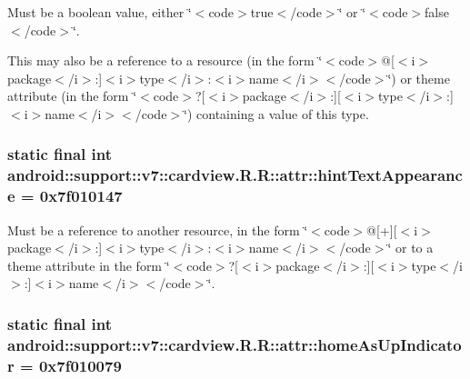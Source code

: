 Must be a boolean value, either \char`\"{}$<$code$>$true$<$/code$>$\char`\"{} or \char`\"{}$<$code$>$false$<$/code$>$\char`\"{}. 

This may also be a reference to a resource (in the form \char`\"{}$<$code$>$@\mbox{[}$<$i$>$package$<$/i$>$:\mbox{]}$<$i$>$type$<$/i$>$:$<$i$>$name$<$/i$>$$<$/code$>$\char`\"{}) or theme attribute (in the form \char`\"{}$<$code$>$?\mbox{[}$<$i$>$package$<$/i$>$:\mbox{]}\mbox{[}$<$i$>$type$<$/i$>$:\mbox{]}$<$i$>$name$<$/i$>$$<$/code$>$\char`\"{}) containing a value of this type. \hypertarget{classandroid_1_1support_1_1v7_1_1cardview_1_1_r_1_1attr_2a1d0df9d22bd5fe16baa2bc1ee11a7d}{
\subsubsection[{hintTextAppearance}]{\setlength{\rightskip}{0pt plus 5cm}static final int android::support::v7::cardview.R.R::attr::hintTextAppearance = 0x7f010147}}
\label{classandroid_1_1support_1_1v7_1_1cardview_1_1_r_1_1attr_2a1d0df9d22bd5fe16baa2bc1ee11a7d}


Must be a reference to another resource, in the form \char`\"{}$<$code$>$@\mbox{[}+\mbox{]}\mbox{[}$<$i$>$package$<$/i$>$:\mbox{]}$<$i$>$type$<$/i$>$:$<$i$>$name$<$/i$>$$<$/code$>$\char`\"{} or to a theme attribute in the form \char`\"{}$<$code$>$?\mbox{[}$<$i$>$package$<$/i$>$:\mbox{]}\mbox{[}$<$i$>$type$<$/i$>$:\mbox{]}$<$i$>$name$<$/i$>$$<$/code$>$\char`\"{}. \hypertarget{classandroid_1_1support_1_1v7_1_1cardview_1_1_r_1_1attr_d99376fd18f1af9562f7424921e3ef88}{
\subsubsection[{homeAsUpIndicator}]{\setlength{\rightskip}{0pt plus 5cm}static final int android::support::v7::cardview.R.R::attr::homeAsUpIndicator = 0x7f010079}}
\label{classandroid_1_1support_1_1v7_1_1cardview_1_1_r_1_1attr_d99376fd18f1af9562f7424921e3ef88}


